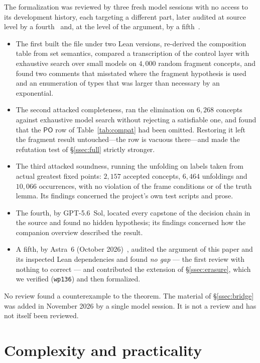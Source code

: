 \documentclass[11pt]{article}
\newcommand{\PO}{\mathsf{PO}}
\theoremstyle{plain}
\theoremstyle{definition}
\begin{document}
The formalization was reviewed by three fresh model sessions with no access to
its development history, each targeting a different part, later audited at
source level by a fourth~\cite{GPT56SolReview} and, at the level of the
argument, by a fifth~\cite{Astra6Review}.
\begin{itemize}
  \item The first built the file under two Lean versions, re-derived the
    composition table from set semantics, compared a transcription of the
    control layer with exhaustive search over small models on $4{,}000$ random
    fragment concepts, and
    found two comments that misstated where the fragment hypothesis is used and
    an enumeration of types that was larger than necessary by an exponential.
  \item The second attacked completeness, ran the elimination on $6{,}268$
    concepts against exhaustive model search without rejecting a satisfiable
    one, and found that the $\PO$ row of Table~\ref{tab:compat} had been
    omitted. Restoring it left the fragment result untouched---the row is
    vacuous there---and made the refutation test of \S\ref{ssec:full} strictly
    stronger.
  \item The third attacked soundness, running the unfolding on labels taken from
    actual greatest fixed points: $2{,}157$ accepted concepts, $6{,}464$
    unfoldings and $10{,}066$ occurrences, with no violation of the frame
    conditions or of the truth lemma. Its findings concerned the project's own
    test scripts and prose.
  \item The fourth, by GPT-5.6~Sol, located every capstone of the decision
    chain in the source and found no hidden hypothesis; its findings concerned
    how the companion overview described the result.
  \item A fifth, by Astra~6 (October 2026)~\cite{Astra6Review}, audited the
    argument of this paper and its inspected Lean dependencies and found
    \emph{no gap} --- the first review with nothing to correct --- and
    contributed the extension of \S\ref{ssec:erasure}, which we verified
    (\texttt{wp136}) and then formalized.
\end{itemize}
No review found a counterexample to the theorem. The material of
\S\ref{ssec:bridge} was added in November 2026 by a single model session. It is
not a review and has not itself been reviewed.

\section{Complexity and practicality}
\label{sec:complexity}
\end{document}
